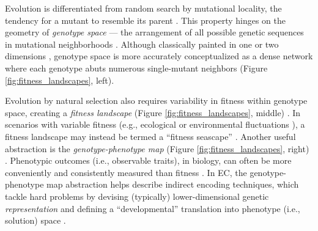 Evolution is differentiated from random search by mutational locality, the tendency for a mutant to resemble its parent \citep{maynardsmith1970natural,galvanlopez2011defining,ashlock2012representation,back1996evolutionary,foster2001evolutionary,richter2014fitness}.
This property hinges on the geometry of \textit{genotype space} --- the arrangement of all possible genetic sequences in mutational neighborhoods \citep{fragata2019evolution,castle2021towards}.
Although classically painted in one or two dimensions \citep{mcleish2015there,greenbury2022structure,gordon1994evolution,gavrilets1997evolution}, genotype space is more accurately conceptualized as a dense network where each genotype abuts numerous single-mutant neighbors (Figure \ref{fig:fitness_landscapes}, left).

Evolution by natural selection also requires variability in fitness within genotype space, creating a \textit{fitness landscape} (Figure \ref{fig:fitness_landscapes}, middle) \citep{pitzer2012comprehensive}.
In scenarios with variable fitness (e.g., ecological or environmental fluctuations \citep{olson2014dynamic,kaplan2008end,dolson2021digital}), a fitness landscape may instead be termed a ``fitness seascape'' \citep{cairns2022strong,mustonen2009fitness}.
Another useful abstraction is the \textit{genotype-phenotype map} (Figure \ref{fig:fitness_landscapes}, right) \citep{ahnert2017structural,aguilar2018architecture,stadler2003landscapes}.
Phenotypic outcomes (i.e., observable traits), in biology, can often be more conveniently and consistently measured than fitness \citep{chen2022environmental,ahnert2017structural,wagner2011pleiotropic,aguilar2018architecture}.
In EC, the genotype-phenotype map abstraction helps describe indirect encoding techniques, which tackle hard problems by devising (typically) lower-dimensional genetic \textit{representation} \citep{ashlock2012representation,rothlauf2003redundant,rothlauf2009representations,mitavskiy2003comparing} and defining a ``developmental'' translation into phenotype (i.e., solution) space \citep{stanley2007compositional,stanley2003taxonomy,stanley2009hypercubebased,clune2011performance,kitano1990designing,hornby2002creating}.

